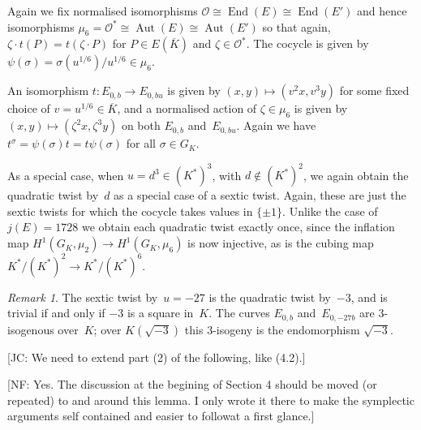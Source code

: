 \documentclass[12pt, reqno]{amsart}
\newcommand{\Kbar}{{\overline{K}}}
\newcommand{\calO}{\mathcal{O}}
\DeclareMathOperator{\Aut}{Aut}
\DeclareMathOperator{\End}{End}
\numberwithin{equation}{section}
\theoremstyle{definition}
\theoremstyle{remark}
\newtheorem{remark}[theorem]{Remark}
\newcommand{\nf}[1]{{\color{blue} \textsf{[NF: #1]}}}
\newcommand{\jc}[1]{{\color{darkgreen} \textsf{[JC: #1]}}}
\begin{document}
Again we fix normalised isomorphisms $\calO\cong\End(E)\cong\End(E')$
and hence isomorphisms $\mu_6=\calO^*\cong\Aut(E)\cong\Aut(E')$ so
that again, $\zeta\cdot t(P)=t(\zeta\cdot P)$ for $P\in E(\Kbar)$ and
$\zeta\in\calO^*$.  The cocycle is given by $\psi(\sigma) =
\sigma(u^{1/6})/u^{1/6} \in \mu_6$.

An isomorphism $t:E_{0,b}\to E_{0,bu}$ is given by
$(x,y)\mapsto(v^2x,v^3y)$ for some fixed choice of
$v=u^{1/6}\in\Kbar$, and a normalised action of $\zeta\in\mu_6$ is
given by $(x,y)\mapsto(\zeta^2x,\zeta^3y)$ on both $E_{0,b}$
and~$E_{0,bu}$.  Again we have $t^\sigma = \psi(\sigma)t =
t\psi(\sigma)$ for all $\sigma\in G_K$.

As a special case, when $u=d^3\in(K^*)^3$, with $d\notin(K^*)^2$, we
again obtain the quadratic twist by~$d$ as a special case of a sextic
twist.  Again, these are just the sextic twists for which the cocycle
takes values in $\{\pm1\}$.  Unlike the case of $j(E)=1728$ we obtain
each quadratic twist exactly once, since the inflation map
$H^1(G_K,\mu_2)\to H^1(G_K,\mu_6)$ is now injective, as is the cubing
map $K^*/(K^*)^2 \to K^*/(K^*)^6$.

\begin{remark}\label{R:3-isog}
The sextic twist by~$u=-27$ is the quadratic twist by~$-3$, and is
trivial if and only if $-3$ is a square in~$K$.  The curves $E_{0,b}$
and~$E_{0,-27b}$ are $3$-isogenous over~$K$; over $K(\sqrt{-3})$ this
$3$-isogeny is the endomorphism $\sqrt{-3}$.
\end{remark}

\jc{We need to extend part (2) of the following, like (4.2).}

\nf{Yes. The discussion at the begining of Section 4 should be moved (or repeated) to and around this lemma. I only wrote it there to make the symplectic arguments self contained and easier to followat a first glance.}
\end{document}
